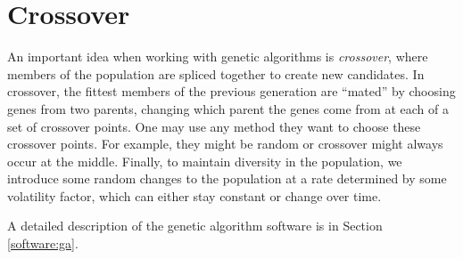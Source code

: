 \section{Crossover}

An important idea when working with genetic algorithms is \textit{crossover}, where members of the population are spliced together to create new candidates.
In crossover, the fittest members of the previous generation are ``mated'' by choosing genes from two parents, changing which parent the genes come from at each of a set of crossover points.
One may use any method they want to choose these crossover points.
For example, they might be random or crossover might always occur at the middle.
Finally, to maintain diversity in the population, we introduce some random changes to the population at a rate determined by some volatility factor, which can either stay constant or change over time.

A detailed description of the genetic algorithm software is in Section \ref{software:ga}.